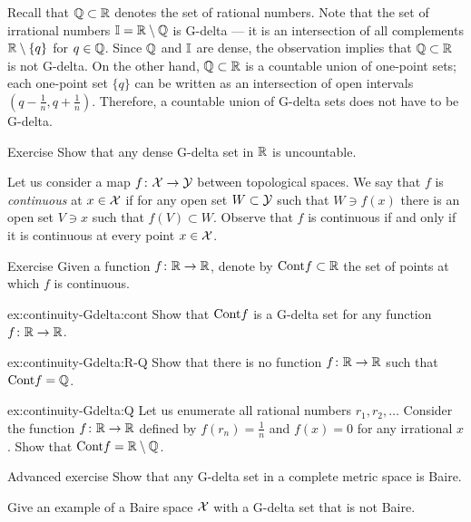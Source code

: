 Recall that $\mathbb{Q}\subset\mathbb{R}$ denotes the set of rational numbers.
Note that the set of irrational numbers $\mathbb{I}=\mathbb{R}\setminus \mathbb{Q}$ is G-delta --- it is an intersection of all complements $\mathbb{R}\setminus\{q\}$ for $q\in\mathbb{Q}$.
Since $\mathbb{Q}$ and $\mathbb{I}$ are dense, the observation implies that $\mathbb{Q}\subset\mathbb{R}$ is not G-delta.
On the other hand, $\mathbb{Q}\subset\mathbb{R}$ is a countable union of one-point sets; each one-point set $\{q\}$ can be written as an intersection of open intervals $(q-\tfrac1n,q+\tfrac1n)$.
Therefore, a countable union of G-delta sets does not have to be G-delta.

\begin{thm}{Exercise}\label{ex:uncountable-Gdelta}
Show that any dense G-delta set in $\mathbb{R}$ is uncountable.
\end{thm}

Let us consider a map $f\colon\mathcal{X}\to\mathcal{Y}$ between topological spaces.
We say that $f$ is \emph{continuous} at $x\in \mathcal{X}$ if for any open set $W\subset \mathcal{Y}$ such that $W\ni f(x)$ there is an open set $V\ni x$ such that $f(V)\subset W$.
Observe that $f$ is continuous if and only if it is continuous at every point $x\in \mathcal{X}$.

\begin{thm}{Exercise}\label{ex:continuity-Gdelta}
Given a function $f\colon \mathbb{R}\to \mathbb{R}$, denote by $\mathrm{Cont} f\subset \mathbb{R}$ the set of points at which $f$ is continuous.

\begin{subthm}{ex:continuity-Gdelta:cont}
Show that $\mathrm{Cont} f$ is a G-delta set for any function $f\colon \mathbb{R}\to \mathbb{R}$.
\end{subthm}

\begin{subthm}{ex:continuity-Gdelta:R-Q}
Show that there is no function $f\colon \mathbb{R}\to \mathbb{R}$ such that $\mathrm{Cont} f=\mathbb{Q}$.
\end{subthm}

\begin{subthm}{ex:continuity-Gdelta:Q}
Let us enumerate all rational numbers $r_1,r_2,\ldots$
Consider the function $f\colon \mathbb{R}\to \mathbb{R}$ defined by $f(r_n)=\tfrac1n$ and $f(x)=0$ for any irrational $x$.
Show that $\mathrm{Cont} f=\mathbb{R}\setminus\mathbb{Q}$.
\end{subthm}

\end{thm}

\begin{thm}{Advanced exercise}\label{ex:Baire-closed-subsets}
Show that any G-delta set in a complete metric space is Baire.

Give an example of a Baire space $\mathcal{X}$ with a G-delta set that is not Baire.
\end{thm}





